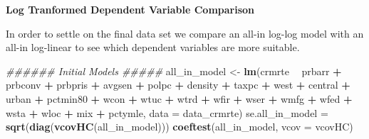 \documentclass[
]{article}
\newenvironment{Shaded}{\begin{snugshade}}{\end{snugshade}}
\newcommand{\CommentTok}[1]{\textcolor[rgb]{0.56,0.35,0.01}{\textit{#1}}}
\newcommand{\DataTypeTok}[1]{\textcolor[rgb]{0.13,0.29,0.53}{#1}}
\newcommand{\KeywordTok}[1]{\textcolor[rgb]{0.13,0.29,0.53}{\textbf{#1}}}
\newcommand{\NormalTok}[1]{#1}
\newcommand{\OperatorTok}[1]{\textcolor[rgb]{0.81,0.36,0.00}{\textbf{#1}}}
\newcommand{\StringTok}[1]{\textcolor[rgb]{0.31,0.60,0.02}{#1}}
\begin{document}
\textbf{Log Tranformed Dependent Variable Comparison}

In order to settle on the final data set we compare an all-in log-log
model with an all-in log-linear to see which dependent variables are
more suitable.\\

\begin{Shaded}
\begin{Highlighting}[]
\CommentTok{###### Initial Models #####}
\NormalTok{all_in_model <-}\StringTok{ }\KeywordTok{lm}\NormalTok{(crmrte }\OperatorTok{~}\StringTok{ }\NormalTok{prbarr }\OperatorTok{+}\StringTok{ }\NormalTok{prbconv }\OperatorTok{+}\StringTok{ }\NormalTok{prbpris }
                   \OperatorTok{+}\StringTok{ }\NormalTok{avgsen }\OperatorTok{+}\StringTok{ }\NormalTok{polpc }\OperatorTok{+}\StringTok{ }\NormalTok{density}
                   \OperatorTok{+}\StringTok{ }\NormalTok{taxpc }\OperatorTok{+}\StringTok{ }\NormalTok{west }\OperatorTok{+}\StringTok{ }\NormalTok{central }\OperatorTok{+}\StringTok{ }\NormalTok{urban }\OperatorTok{+}\StringTok{ }\NormalTok{pctmin80 }\OperatorTok{+}\StringTok{ }\NormalTok{wcon}
                   \OperatorTok{+}\StringTok{ }\NormalTok{wtuc }\OperatorTok{+}\StringTok{ }\NormalTok{wtrd }\OperatorTok{+}\StringTok{ }\NormalTok{wfir }\OperatorTok{+}\StringTok{ }\NormalTok{wser }\OperatorTok{+}\StringTok{ }\NormalTok{wmfg }
                   \OperatorTok{+}\StringTok{ }\NormalTok{wfed }\OperatorTok{+}\StringTok{ }\NormalTok{wsta }\OperatorTok{+}\StringTok{ }\NormalTok{wloc}
                   \OperatorTok{+}\StringTok{ }\NormalTok{mix }\OperatorTok{+}\StringTok{ }\NormalTok{pctymle,}
                   \DataTypeTok{data =}\NormalTok{ data_crmrte)}
\NormalTok{se.all_in_model =}\StringTok{ }\KeywordTok{sqrt}\NormalTok{(}\KeywordTok{diag}\NormalTok{(}\KeywordTok{vcovHC}\NormalTok{(all_in_model)))}
\KeywordTok{coeftest}\NormalTok{(all_in_model, }\DataTypeTok{vcov =}\NormalTok{ vcovHC)}
\end{Highlighting}
\end{Shaded}
\end{document}
